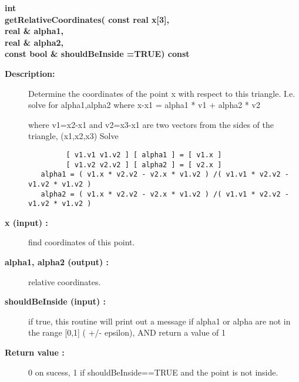 \begin{flushleft} \textbf{%
int  \\ 
\settowidth{\TriangleIncludeArgIndent}{getRelativeCoordinates(}%
getRelativeCoordinates( const real x[3], \\ 
\hspace{\TriangleIncludeArgIndent}real \& alpha1, \\ 
\hspace{\TriangleIncludeArgIndent}real \& alpha2, \\ 
\hspace{\TriangleIncludeArgIndent}const bool \& shouldBeInside  =TRUE) const
}\end{flushleft}
\begin{description}
\item[{\bf Description:}] 

  Determine the coordinates of the point x with respect to this triangle. I.e. solve for alpha1,alpha2 where 
           x-x1 = alpha1 * v1 + alpha2 * v2

  where v1=x2-x1 and v2=x3-x1 are two vectors from the sides of the triangle, (x1,x2,x3)
    Solve
 \begin{verbatim}
         [ v1.v1 v1.v2 ] [ alpha1 ] = [ v1.x ]
         [ v1.v2 v2.v2 ] [ alpha2 ] = [ v2.x ]
   alpha1 = ( v1.x * v2.v2 - v2.x * v1.v2 ) /( v1.v1 * v2.v2 - v1.v2 * v1.v2 )
   alpha2 = ( v1.x * v2.v2 - v2.x * v1.v2 ) /( v1.v1 * v2.v2 - v1.v2 * v1.v2 )
 \end{verbatim}

\item[{\bf x (input) :}]  find coordinates of this point.
\item[{\bf alpha1, alpha2 (output) :}]  relative coordinates.
\item[{\bf shouldBeInside (input) :}]  if true, this routine will print out a message if alpha1 or alpha
   are not in the range [0,1]  ( +/- epsilon), AND return a value of 1
\item[{\bf Return value :}]  0 on sucess, 1 if shouldBeInside==TRUE and the point is not inside.

\end{description}
